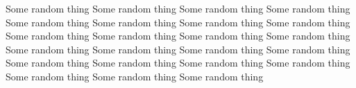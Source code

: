 Some random thing Some random thing Some random thing Some random thing Some random thing Some random thing Some random thing Some random thing Some random thing Some random thing Some random thing Some random thing Some random thing Some random thing Some random thing Some random thing Some random thing Some random thing Some random thing Some random thing Some random thing Some random thing Some random thing  

